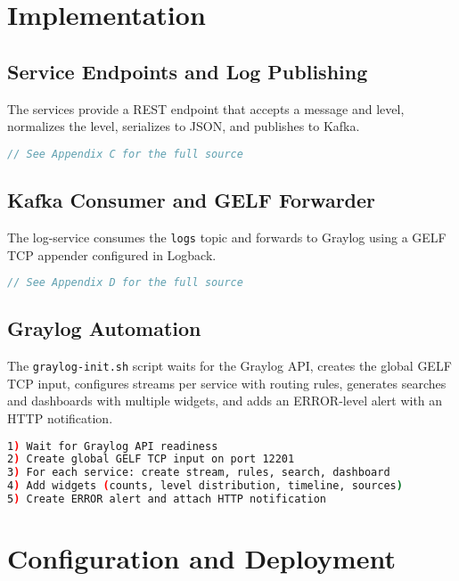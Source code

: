 \documentclass[12pt,a4paper]{report}
\begin{document}
\chapter{Implementation}
\section{Service Endpoints and Log Publishing}
The services provide a REST endpoint that accepts a message and level, normalizes the level, serializes to JSON, and publishes to Kafka.

\begin{lstlisting}[language=Java,caption={Excerpt: service1 LogController (publishing to Kafka)},label={lst:logcontroller}]
// See Appendix C for the full source
\end{lstlisting}

\section{Kafka Consumer and GELF Forwarder}
The log-service consumes the \texttt{logs} topic and forwards to Graylog using a GELF TCP appender configured in Logback.

\begin{lstlisting}[language=Java,caption={Excerpt: log-service Kafka consumer},label={lst:logconsumer}]
// See Appendix D for the full source
\end{lstlisting}

\section{Graylog Automation}
The \texttt{graylog-init.sh} script waits for the Graylog API, creates the global GELF TCP input, configures streams per service with routing rules, generates searches and dashboards with multiple widgets, and adds an ERROR-level alert with an HTTP notification.

\begin{lstlisting}[language=bash,caption={Automation script responsibilities},label={lst:initoverview}]
1) Wait for Graylog API readiness
2) Create global GELF TCP input on port 12201
3) For each service: create stream, rules, search, dashboard
4) Add widgets (counts, level distribution, timeline, sources)
5) Create ERROR alert and attach HTTP notification
\end{lstlisting}

\chapter{Configuration and Deployment}
\end{document}
